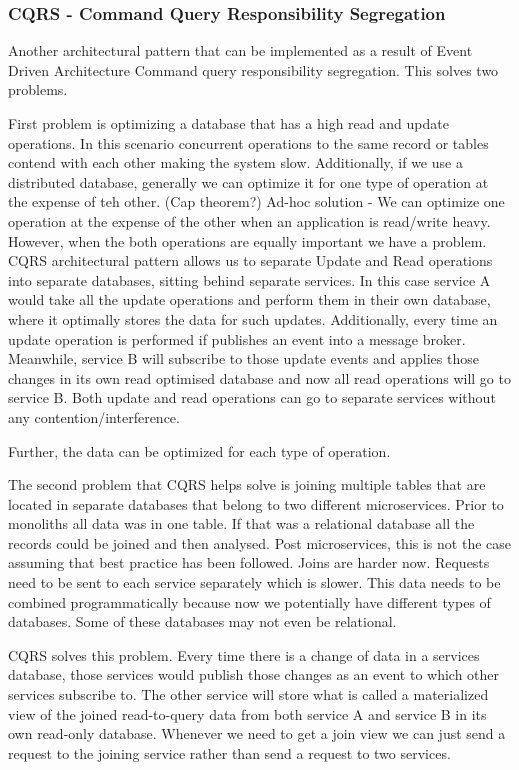 \subsubsection{CQRS - Command Query Responsibility Segregation}
Another architectural pattern that can be implemented as a result of Event Driven Architecture
Command query responsibility segregation.
This solves two problems.

First problem is optimizing a database that has a high read and update operations.
In this scenario concurrent operations to the same record or tables contend with each other making the system slow.
Additionally, if we use a distributed database, generally we can optimize it for one type of operation at the expense of teh other.
(Cap theorem?)
Ad-hoc solution - We can optimize one operation at the expense of the other when an application is read/write heavy.
However, when the both operations are equally important we have a problem.
CQRS architectural pattern allows us to separate Update and Read operations into separate databases, sitting behind separate services.
In this case service A would take all the update operations and perform them in their own database, where it optimally stores the data for such updates.
Additionally, every time an update operation is performed if publishes an event into a message broker.
Meanwhile, service B will subscribe to those update events and applies those changes in its own read optimised database and now all read operations will go to service B.
Both update and read operations can go to separate services without any contention/interference.

Further, the data can be optimized for each type of operation.

The second problem that CQRS helps solve is joining multiple tables that are located in separate databases that belong to two different microservices.
Prior to monoliths all data was in one table.
If that was a relational database all the records could be joined and then analysed.
Post microservices, this is not the case assuming that best practice has been followed.
Joins are harder now.
Requests need to be sent to each service separately which is slower.
This data needs to be combined programmatically because now we potentially have different types of databases.
Some of these databases may not even be relational.

CQRS solves this problem.
Every time there is a change of data in a services database, those services would publish those changes as an event to which other services subscribe to.
The other service will store what is called a materialized view of the joined read-to-query data from both service A and service B in its own read-only database.
Whenever we need to get a join view we can just send a request to the joining service rather than send a request to two services.


